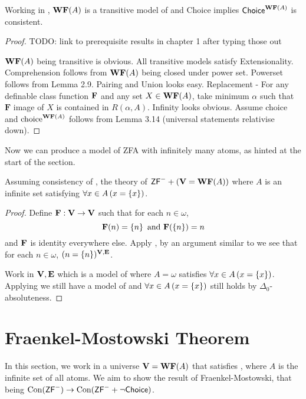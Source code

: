 \begin{lemma} \label{WFfromA}
    Working in \ZFminus, \(\mathbf{WF}(A)\) is a transitive model of \ZFminus and {\normalfont\textsf{Choice}} implies \({\normalfont\textsf{Choice}}^{\mathbf{WF}(A)}\) is consistent.
\end{lemma}
\begin{proof}
    TODO: link to prerequisite results in chapter 1 after typing those out

    \(\mathbf{WF}(A)\) being transitive is obvious.
    All transitive models satisfy Extensionality.
    Comprehension follows from \(\mathbf{WF}(A)\) being closed under power set.
    Powerset follows from Lemma 2.9.
    Pairing and Union looks easy.
    Replacement - For any definable class function \(\mathbf{F}\) and any set \(X\in\mathbf{WF}(A)\), take minimum \(\alpha\) such that \(\mathbf{F}\) image of \(X\) is contained in \(R(\alpha, A)\).
    Infinity looks obvious.
    Assume choice and \(\text{choice}^{\mathbf{WF}(A)}\) follows from Lemma 3.14 (universal statements relativise down).
\end{proof}

Now we can produce a model of \textsf{ZFA} with infinitely many atoms, as hinted at the start of the section.
\begin{theorem}
    Assuming consistency of \ZFminus, the theory of \(\mbox{\normalfont \textsf{ZF}}^- + (\mathbf{V}=\mathbf{WF}(A))\) where \(A\) is an infinite set satisfying \(\forall x\in A\left(x = \left\{ x \right\}\right)\).
\end{theorem}
\begin{proof}
    Define \(\mathbf{F}:\mathbf{V}\to\mathbf{V}\) such that for each \(n\in\omega\),
    \[ \mathbf{F}(n) = \left\{ n \right\} \text{ and } \mathbf{F}(\left\{ n \right\}) = n \]
    and \(\mathbf{F}\) is identity everywhere else.
    Apply , by an argument similar to  we see that for each \(n\in\omega\), \((n = \left\{ n \right\})^{\mathbf{V},\mathbf{E}}\).

    Work in \(\mathbf{V},\mathbf{E}\) which is a model of \ZFminus where \(A = \omega\) satisfies \(\forall x\in A\left(x = \left\{ x \right\}\right)\).
    Applying  we still have a model of \ZFminus and \(\forall x\in A\left(x = \left\{ x \right\}\right)\) still holds by \(\Delta_0\)-absoluteness.
\end{proof}

\section{Fraenkel-Mostowski Theorem}

\newcommand{\Con}{\operatorname{Con}}
In this section, we work in a universe \(\mathbf{V} = \mathbf{WF}(A)\) that satisfies \ZFminus, where \(A\) is the infinite set of all atoms.
We aim to show the result of Fraenkel-Mostowski, that being
\(\Con(\ZFminus) \to \Con(\ZFminus + \lnot\textsf{Choice})\).

